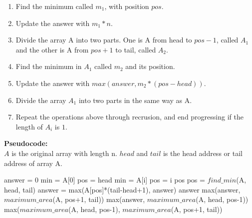 \begin{parts}
    \begin{solution}
        \begin{enumerate}
            \item Find the minimum called $m_1$, with position $pos$.
            \item Update the answer with $m_1 * n$.
            \item Divide the array A into two parts. One is A from head to $pos-1$, called $A_1$ and the other is A from $pos+1$ to tail, called $A_2$.
            \item Find the minimum in $A_1$ called $m_2$ and its position.
            \item Update the answer with $max(answer, m_2 * (pos-head))$.\
            \item Divide the array $A_1$ into two parts in the same way as A.
            \item Repeat the operations above through recrusion, and end progressing if the length of $A_i$ is $1$.
        \end{enumerate}
        \textbf{Pseudocode:}\\
        $A$ is the original array with length n. $head$ and $tail$ is the head address or tail address of array A.
        \begin{algorithm}[H]
            \color{blue}
            \begin{algorithmic}[1]
                \State answer = 0
                \State min = A[0]
                \State pos = head
                \State {}
                \State \State {}
                \State \State \State min = A[i]
                \State \State \State pos = i
                \State \State \EndIf
                \State \EndFor
                \State \Return pos
                \EndFunction
                \State pos = $find\_min$(A, head, tail)
                \State answer = max(A[pos]*(tail-head+1), answer)
                \If {head == tail}
                \State \Return answer
                \EndIf
                \State \Return max(answer, $maximum\_area$(A, pos+1, tail))
                \ElsIf {pos == tail}
                \State \Return max(answer, $maximum\_area$(A, head, pos-1))
                \Else
                \State \Return max($maximum\_area$(A, head, pos-1), $maximum\_area$(A, pos+1, tail))
                \EndIf
                \EndFunction
            \end{algorithmic}
        \end{algorithm}
    \end{solution}


\end{parts}
